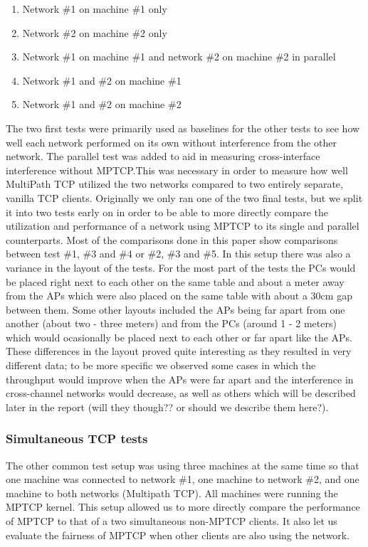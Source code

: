 \begin{enumerate}
  \item Network \#1 on machine \#1 only
  \item Network \#2 on machine \#2 only
  \item Network \#1 on machine \#1 and network \#2 on machine \#2 in parallel
  \item Network \#1 and \#2 on machine \#1
  \item Network \#1 and \#2 on machine \#2
\end{enumerate}

The two first tests were primarily used as baselines for the other tests to see
how well each network performed on its own without interference from the other
network. The parallel test was added to aid in measuring cross-interface
interference without MPTCP.\@ This was necessary in order to measure how well
MultiPath TCP utilized the two networks compared to two entirely separate,
vanilla TCP clients. Originally we only ran one of the two final tests, but we
split it into two tests early on in order to be able to more directly compare
the utilization and performance of a network using MPTCP to its single and
parallel counterparts. Most of the comparisons done in this paper show
comparisons between test \#1, \#3 and \#4 or \#2, \#3 and \#5.
In this setup there was also a variance in the layout of the tests. For the most
part of the tests the PCs would be placed right next to each other on the same 
table and about a meter away from the APs which were also placed on the same 
table with about a 30cm gap between them. Some other layouts included the APs 
being far apart from one another (about two - three meters) and from the PCs 
(around 1 - 2 meters) which would ocasionally be placed next to each other or 
far apart like the APs. These differences in the layout proved quite interesting
as they resulted in very different data; to be more specific we observed some 
cases in which the throughput would improve when the APs were far apart and the 
interference in cross-channel networks would decrease, as well as others which 
will be described later in the report (will they though?? or should we describe 
them here?).   

\subsubsection{Simultaneous TCP tests}
The other common test setup was using three machines at the same time so that
one machine was connected to network \#1, one machine to network \#2, and one
machine to both networks (Multipath TCP). All machines were running the MPTCP 
kernel. This setup allowed us to more directly compare the performance of MPTCP 
to that of a two simultaneous non-MPTCP clients. It also let us evaluate the 
fairness of MPTCP when other clients are also using the network.

